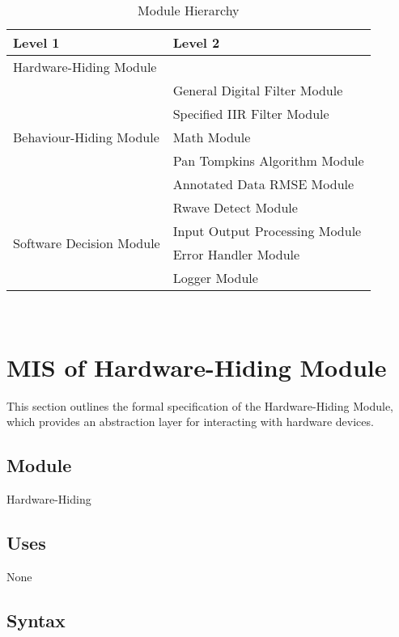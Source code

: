 \documentclass[12pt, titlepage]{article}
\begin{document}
\begin{table}[h!]
\centering
\begin{tabular}{p{} p{}}
\toprule
\textbf{Level 1} & \textbf{Level 2}\\
\midrule

{Hardware-Hiding Module} & ~ \\
\midrule

\multirow{5}{0.3\textwidth}{Behaviour-Hiding Module}
& General Digital Filter Module \\
& Specified IIR Filter Module \\
& Math Module \\
& Pan Tompkins Algorithm Module \\
& Annotated Data RMSE Module \\
\midrule

\multirow{4}{0.3\textwidth}{Software Decision Module}
& Rwave Detect Module \\
& Input Output Processing Module \\
& Error Handler Module \\
& Logger Module \\
\bottomrule

\end{tabular}
\caption{Module Hierarchy}
\label{TblMH}
\end{table}

\newpage
~\newpage

\section{MIS of Hardware-Hiding Module} \label{MIS_HH}

This section outlines the formal specification of the Hardware-Hiding Module,
which provides an abstraction layer for interacting with hardware devices.

\subsection{Module}

Hardware-Hiding

\subsection{Uses}

None

\subsection{Syntax}
\end{document}
